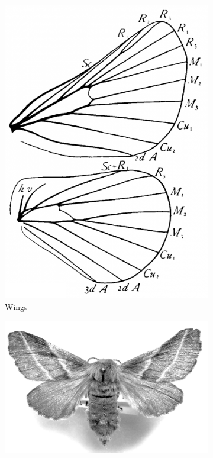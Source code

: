 \documentclass[letterpaper, 11pt]{article}
\begin{document}
\begin{figure}[ht!]
    \centering
    \begin{subfigure}[ht!]{0.3\textwidth}
        \includegraphics[width=\textwidth]{LasiocampidWings}
        \caption{Wings \citep[Fig. 69]{comstock1918wings}}
        \label{fig:lasiocampid1}
    \end{subfigure}
    \hfill %
    \begin{subfigure}[ht!]{0.5\textwidth}
        \includegraphics[width=\textwidth]{lasiocampidHabitus.png}

\end{subfigure}
\end{figure}
\end{document}
